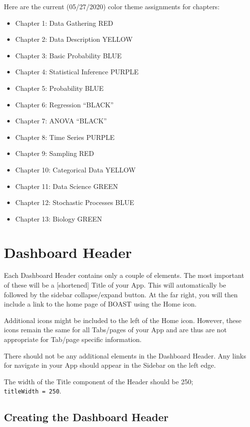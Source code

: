 \documentclass[
]{book}
\providecommand{\tightlist}{%
  \setlength{\itemsep}{0pt}\setlength{\parskip}{0pt}}
\begin{document}
Here are the current (05/27/2020) color theme assignments for chapters:

\begin{itemize}
\tightlist
\item
  Chapter 1: Data Gathering RED
\item
  Chapter 2: Data Description YELLOW
\item
  Chapter 3: Basic Probability BLUE
\item
  Chapter 4: Statistical Inference PURPLE
\item
  Chapter 5: Probability BLUE
\item
  Chapter 6: Regression ``BLACK''
\item
  Chapter 7: ANOVA ``BLACK''
\item
  Chapter 8: Time Series PURPLE
\item
  Chapter 9: Sampling RED
\item
  Chapter 10: Categorical Data YELLOW
\item
  Chapter 11: Data Science GREEN
\item
  Chapter 12: Stochastic Processes BLUE
\item
  Chapter 13: Biology GREEN
\end{itemize}

\hypertarget{headerb}{%
\section{Dashboard Header}\label{headerb}}

Each Dashboard Header contains only a couple of elements. The most important of these will be a {[}shortened{]} Title of your App. This will automatically be followed by the sidebar collapse/expand button. At the far right, you will then include a link to the home page of BOAST using the Home icon.

Additional icons might be included to the left of the Home icon. However, these icons remain the same for all Tabs/pages of your App and are thus are not appropriate for Tab/page specific information.

There should not be any additional elements in the Dashboard Header. Any links for navigate in your App should appear in the Sidebar on the left edge.

The width of the Title component of the Header should be 250; \texttt{titleWidth\ =\ 250}.

\hypertarget{creating-the-dashboard-header-1}{%
\subsection{Creating the Dashboard Header}\label{creating-the-dashboard-header-1}}
\end{document}
